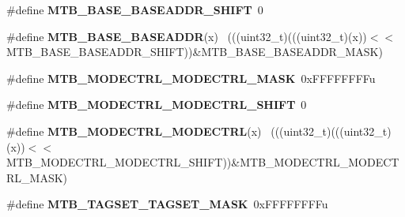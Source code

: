 \begin{DoxyCompactItemize}
\item 
\hypertarget{group___m_t_b___register___masks_gaaa4c5bd3736221b3c88252a206a4b716}{}\#define {\bfseries M\+T\+B\+\_\+\+B\+A\+S\+E\+\_\+\+B\+A\+S\+E\+A\+D\+D\+R\+\_\+\+S\+H\+I\+F\+T}~0\label{group___m_t_b___register___masks_gaaa4c5bd3736221b3c88252a206a4b716}

\item 
\hypertarget{group___m_t_b___register___masks_gaadfdc674a6322fe080c1f41f1017b857}{}\#define {\bfseries M\+T\+B\+\_\+\+B\+A\+S\+E\+\_\+\+B\+A\+S\+E\+A\+D\+D\+R}(x)                                      ~(((uint32\+\_\+t)(((uint32\+\_\+t)(x))$<$$<$M\+T\+B\+\_\+\+B\+A\+S\+E\+\_\+\+B\+A\+S\+E\+A\+D\+D\+R\+\_\+\+S\+H\+I\+F\+T))\&M\+T\+B\+\_\+\+B\+A\+S\+E\+\_\+\+B\+A\+S\+E\+A\+D\+D\+R\+\_\+\+M\+A\+S\+K)\label{group___m_t_b___register___masks_gaadfdc674a6322fe080c1f41f1017b857}

\item 
\hypertarget{group___m_t_b___register___masks_ga1d66deff1d032af57ab9b808a240fa3a}{}\#define {\bfseries M\+T\+B\+\_\+\+M\+O\+D\+E\+C\+T\+R\+L\+\_\+\+M\+O\+D\+E\+C\+T\+R\+L\+\_\+\+M\+A\+S\+K}~0x\+F\+F\+F\+F\+F\+F\+F\+Fu\label{group___m_t_b___register___masks_ga1d66deff1d032af57ab9b808a240fa3a}

\item 
\hypertarget{group___m_t_b___register___masks_gaa771d72e2a22b472cb0f5daceeef22bb}{}\#define {\bfseries M\+T\+B\+\_\+\+M\+O\+D\+E\+C\+T\+R\+L\+\_\+\+M\+O\+D\+E\+C\+T\+R\+L\+\_\+\+S\+H\+I\+F\+T}~0\label{group___m_t_b___register___masks_gaa771d72e2a22b472cb0f5daceeef22bb}

\item 
\hypertarget{group___m_t_b___register___masks_gaa1b6a675209b1acc09a8eccc95797b29}{}\#define {\bfseries M\+T\+B\+\_\+\+M\+O\+D\+E\+C\+T\+R\+L\+\_\+\+M\+O\+D\+E\+C\+T\+R\+L}(x)                              ~(((uint32\+\_\+t)(((uint32\+\_\+t)(x))$<$$<$M\+T\+B\+\_\+\+M\+O\+D\+E\+C\+T\+R\+L\+\_\+\+M\+O\+D\+E\+C\+T\+R\+L\+\_\+\+S\+H\+I\+F\+T))\&M\+T\+B\+\_\+\+M\+O\+D\+E\+C\+T\+R\+L\+\_\+\+M\+O\+D\+E\+C\+T\+R\+L\+\_\+\+M\+A\+S\+K)\label{group___m_t_b___register___masks_gaa1b6a675209b1acc09a8eccc95797b29}

\item 
\hypertarget{group___m_t_b___register___masks_gae10888ce190a167551d534dac7019f9d}{}\#define {\bfseries M\+T\+B\+\_\+\+T\+A\+G\+S\+E\+T\+\_\+\+T\+A\+G\+S\+E\+T\+\_\+\+M\+A\+S\+K}~0x\+F\+F\+F\+F\+F\+F\+F\+Fu\label{group___m_t_b___register___masks_gae10888ce190a167551d534dac7019f9d}


\end{DoxyCompactItemize}
